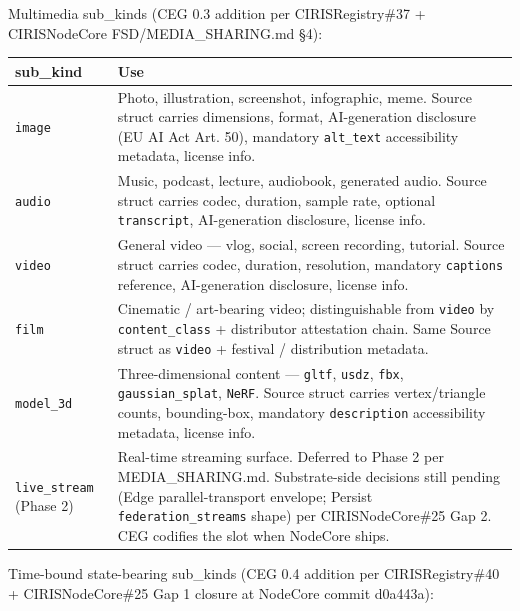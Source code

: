 \documentclass[10pt]{article}
\begin{document}
Multimedia sub\_kinds (CEG 0.3 addition per CIRISRegistry\#37 + CIRISNodeCore FSD/MEDIA\_SHARING.md §4):


{\footnotesize
\begin{longtable}{|p{8.0cm}|p{8.0cm}|}\hline
\textbf{sub\_kind} & \textbf{Use} \\ \hline\endhead
\texttt{image} & Photo, illustration, screenshot, infographic, meme. Source struct carries dimensions, format, AI-generation disclosure (EU AI Act Art. 50), mandatory \texttt{alt\_text} accessibility metadata, license info. \\ \hline
\texttt{audio} & Music, podcast, lecture, audiobook, generated audio. Source struct carries codec, duration, sample rate, optional \texttt{transcript}, AI-generation disclosure, license info. \\ \hline
\texttt{video} & General video — vlog, social, screen recording, tutorial. Source struct carries codec, duration, resolution, mandatory \texttt{captions} reference, AI-generation disclosure, license info. \\ \hline
\texttt{film} & Cinematic / art-bearing video; distinguishable from \texttt{video} by \texttt{content\_class} + distributor attestation chain. Same Source struct as \texttt{video} + festival / distribution metadata. \\ \hline
\texttt{model\_3d} & Three-dimensional content — \texttt{gltf}, \texttt{usdz}, \texttt{fbx}, \texttt{gaussian\_splat}, \texttt{NeRF}. Source struct carries vertex/triangle counts, bounding-box, mandatory \texttt{description} accessibility metadata, license info. \\ \hline
\texttt{live\_stream} (Phase 2) & Real-time streaming surface. Deferred to Phase 2 per MEDIA\_SHARING.md. Substrate-side decisions still pending (Edge parallel-transport envelope; Persist \texttt{federation\_streams} shape) per CIRISNodeCore\#25 Gap 2. CEG codifies the slot when NodeCore ships. \\ \hline
\end{longtable}}


Time-bound state-bearing sub\_kinds (CEG 0.4 addition per CIRISRegistry\#40 + CIRISNodeCore\#25 Gap 1 closure at NodeCore commit d0a443a):
\end{document}
